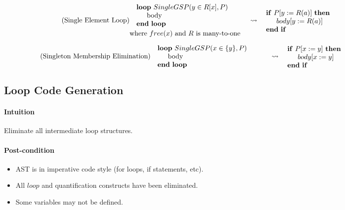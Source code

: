 \documentclass{article}
\begin{document}
\noindent\begin{minipage}{\linewidth}
\begin{align}
  \tag{Single Element Loop}
  \begin{minipage}[]{0.5\textwidth}
  \begin{algorithmic}
    \Loop\ $SingleGSP(y \in R[x], P)$
      \State body
    \EndLoop
  \end{algorithmic}
  \text{where $free(x)$ and $R$ is many-to-one}
  \end{minipage}
  &\leadsto
  \begin{minipage}[]{0.5\textwidth}
  \begin{algorithmic}
    \If{$P[y:=R(a)]$}
      \State $body[y:=R(a)]$
    \EndIf
  \end{algorithmic}
  \end{minipage}
\end{align}
\end{minipage}
\noindent\begin{minipage}{\linewidth}
\begin{align}
  \tag{Singleton Membership Elimination}
  \begin{minipage}[]{0.5\textwidth}
  \begin{algorithmic}
    \Loop\ $SingleGSP(x \in \{y\}, P)$
      \State body
    \EndLoop
  \end{algorithmic}
  \end{minipage}
  &\leadsto
  \begin{minipage}[]{0.5\textwidth}
  \begin{algorithmic}
    \If{$P[x:=y]$}
      \State $body[x:=y]$
    \EndIf
  \end{algorithmic}
  \end{minipage}
\end{align}
\end{minipage}

\subsection{Loop Code Generation}

\paragraph{Intuition} Eliminate all intermediate loop structures.

\paragraph{Post-condition}
\begin{itemize}
  \item AST is in imperative code style (for loops, if statements, etc).
  \item All $loop$ and quantification constructs have been eliminated.
  \item Some variables may not be defined.
\end{itemize}
\end{document}
